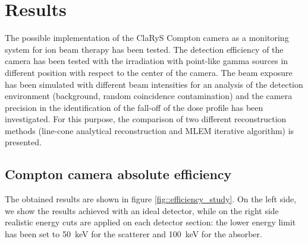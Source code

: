 \section{Results}
The possible implementation of the ClaRyS Compton camera as a monitoring system for ion beam therapy has been tested. The detection efficiency of the camera has been tested with the irradiation with point-like gamma sources in different position with respect to the center of the camera. The beam exposure has been simulated with different beam intensities for an analysis of the detection environment (background, random coincidence contamination) and the camera precision in the identification of the fall-off of the dose profile has been investigated. For this purpose, the comparison of two different reconstruction methods (line-cone analytical reconstruction and MLEM iterative algorithm) is presented. 


\subsection{Compton camera absolute efficiency}
\label{Results::efficiency}

The obtained results are shown in figure \ref{fig::efficiency_study}. On the left side, we show the results achieved with an ideal detector, while on the right side realistic energy cuts are applied on each detector section: the lower energy limit  has been set to 50~keV for the scatterer and 100~keV for the absorber.

